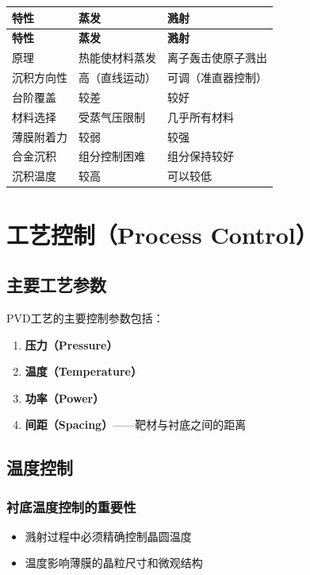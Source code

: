 \documentclass[UTF8,12pt,a4paper]{ctexart}
\begin{document}
\begin{longtable}{|L{3cm}|L{5.5cm}|L{5.5cm}|}
\hline
\textbf{特性} & \textbf{蒸发} & \textbf{溅射} \\
\hline
\endfirsthead
\hline
\textbf{特性} & \textbf{蒸发} & \textbf{溅射} \\
\hline
\endhead
\hline
\endfoot
\hline
\endlastfoot

原理 & 热能使材料蒸发 & 离子轰击使原子溅出 \\
\hline
沉积方向性 & 高（直线运动） & 可调（准直器控制） \\
\hline
台阶覆盖 & 较差 & 较好 \\
\hline
材料选择 & 受蒸气压限制 & 几乎所有材料 \\
\hline
薄膜附着力 & 较弱 & 较强 \\
\hline
合金沉积 & 组分控制困难 & 组分保持较好 \\
\hline
沉积温度 & 较高 & 可以较低 \\
\hline
\end{longtable}

\section{工艺控制（Process Control）}

\subsection{主要工艺参数}

PVD工艺的主要控制参数包括：

\begin{enumerate}
    \item \textbf{压力（Pressure）}
    \item \textbf{温度（Temperature）}
    \item \textbf{功率（Power）}
    \item \textbf{间距（Spacing）}——靶材与衬底之间的距离
\end{enumerate}

\subsection{温度控制}

\subsubsection{衬底温度控制的重要性}

\begin{itemize}
    \item 溅射过程中必须精确控制晶圆温度
    \item 温度影响薄膜的晶粒尺寸和微观结构
\end{itemize}
\end{document}
